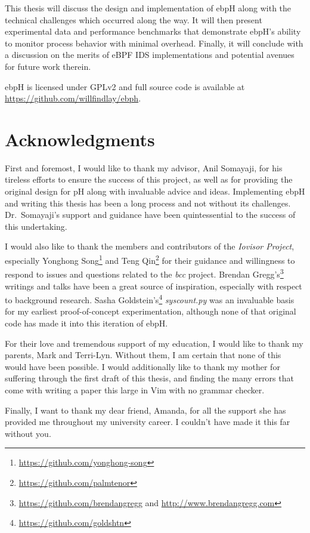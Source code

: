 \documentclass[
  12pt]{findlay}
\begin{document}
This thesis will discuss the design and implementation of ebpH along
with the technical challenges which occurred along the way. It will then
present experimental data and performance benchmarks that demonstrate
ebpH's ability to monitor process behavior with minimal overhead.
Finally, it will conclude with a discussion on the merits of eBPF IDS
implementations and potential avenues for future work therein.

ebpH is licensed under GPLv2 and full source code is available at
\url{https://github.com/willfindlay/ebph}.

\newpage
\section*{Acknowledgments}

First and foremost, I would like to thank my advisor, Anil Somayaji, for
his tireless efforts to ensure the success of this project, as well as
for providing the original design for pH along with invaluable advice
and ideas. Implementing ebpH and writing this thesis has been a long
process and not without its challenges. Dr.~Somayaji's support and
guidance have been quintessential to the success of this undertaking.

I would also like to thank the members and contributors of the
\emph{Iovisor Project}, especially Yonghong
Song\footnote{\url{https://github.com/yonghong-song}} and Teng
Qin\footnote{\url{https://github.com/palmtenor}} for their guidance and
willingness to respond to issues and questions related to the \emph{bcc}
project. Brendan
Gregg's\footnote{\url{https://github.com/brendangregg} and \url{http://www.brendangregg.com}}
writings and talks have been a great source of inspiration, especially
with respect to background research. Sasha
Goldstein's\footnote{\url{https://github.com/goldshtn}}
\emph{syscount.py} was an invaluable basis for my earliest
proof-of-concept experimentation, although none of that original code
has made it into this iteration of ebpH.

For their love and tremendous support of my education, I would like to
thank my parents, Mark and Terri-Lyn. Without them, I am certain that
none of this would have been possible. I would additionally like to
thank my mother for suffering through the first draft of this thesis,
and finding the many errors that come with writing a paper this large in
Vim with no grammar checker.

Finally, I want to thank my dear friend, Amanda, for all the support she
has provided me throughout my university career. I couldn't have made it
this far without you.
\end{document}

